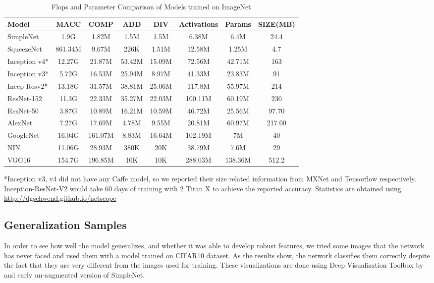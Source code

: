 \documentclass{article} \usepackage{lets_keepit_simple,times}
\begin{document}
\begin{table}[h!]
\caption{Flops and Parameter Comparison of Models trained on ImageNet}\label{tab:Flops_appndx}
\begin{center}
\begin{tabular}{lccccccc}
\textbf{Model} & \textbf{MACC} & \textbf{COMP} & \textbf{ADD} & \textbf{DIV} & \textbf{Activations} & \textbf{Params} & \textbf{SIZE(MB)}\\ \hline
SimpleNet & 1.9G & 1.82M & 1.5M & 1.5M & 6.38M & 6.4M & 24.4 \\
SqueezeNet & 861.34M & 9.67M & 226K & 1.51M & 12.58M & 1.25M & 4.7  \\
Inception v4* & 12.27G & 21.87M & 53.42M & 15.09M & 72.56M & 42.71M & 163 \\
Inception v3* & 5.72G & 16.53M & 25.94M & 8.97M & 41.33M & 23.83M & 91 \\
Incep-Resv2* & 13.18G & 31.57M & 38.81M & 25.06M & 117.8M & 55.97M & 214\\
ResNet-152 & 11.3G & 22.33M & 35.27M & 22.03M & 100.11M & 60.19M & 230 \\ 
ResNet-50 & 3.87G & 10.89M & 16.21M & 10.59M & 46.72M & 25.56M & 97.70 \\ 
AlexNet & 7.27G & 17.69M & 4.78M & 9.55M & 20.81M & 60.97M & 217.00 \\ 
GoogleNet & 16.04G & 161.07M & 8.83M & 16.64M & 102.19M & 7M & 40 \\ 
NIN & 11.06G & 28.93M & 380K & 20K & 38.79M & 7.6M & 29 \\ 
VGG16 & 154.7G & 196.85M & 10K & 10K & 288.03M & 138.36M & 512.2 \\ \hline
\end{tabular}
\end{center}
\end{table}

*Inception v3, v4 did not have any Caffe model, so we reported their size related information from MXNet  and Tensorflow  respectively. Inception-ResNet-V2 would take 60 days of training with 2 Titan X to achieve the reported accuracy.
Statistics are obtained using \url{http://dgschwend.github.io/netscope} 





\subsection{Generalization Samples}
In order to see how well the model generalizes, and whether it was able to develop robust features, we tried some images that the network has never faced and used them with a model trained on CIFAR10 dataset. As the results show, the network classifies them correctly despite the fact that they are very different from the images used for training. These visualizations are done using Deep Visualization Toolbox  by \cite{Yosinski_Understanding_deepvis_2015} and early un-augmented version of SimpleNet.
\end{document}
